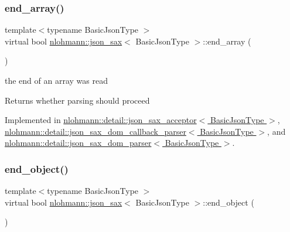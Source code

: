 \subsubsection{\texorpdfstring{end\+\_\+array()}{end\_array()}}
{\footnotesize\ttfamily template$<$typename Basic\+Json\+Type $>$ \\
virtual bool \hyperlink{structnlohmann_1_1json__sax}{nlohmann\+::json\+\_\+sax}$<$ Basic\+Json\+Type $>$\+::end\+\_\+array (\begin{DoxyParamCaption}{ }\end{DoxyParamCaption})\hspace{0.3cm}{\ttfamily [pure virtual]}}



the end of an array was read 

\begin{DoxyReturn}{Returns}
whether parsing should proceed 
\end{DoxyReturn}


Implemented in \hyperlink{classnlohmann_1_1detail_1_1json__sax__acceptor_a32579cf8b5dda19a09810f4d6f9ff9af}{nlohmann\+::detail\+::json\+\_\+sax\+\_\+acceptor$<$ Basic\+Json\+Type $>$}, \hyperlink{classnlohmann_1_1detail_1_1json__sax__dom__callback__parser_ad708f4730851caff42097dc59e610e6d}{nlohmann\+::detail\+::json\+\_\+sax\+\_\+dom\+\_\+callback\+\_\+parser$<$ Basic\+Json\+Type $>$}, and \hyperlink{classnlohmann_1_1detail_1_1json__sax__dom__parser_aa6abf5a95889056d92d6af63a831b854}{nlohmann\+::detail\+::json\+\_\+sax\+\_\+dom\+\_\+parser$<$ Basic\+Json\+Type $>$}.

\mbox{\label{structnlohmann_1_1json__sax_ad0c722d53ff97be700ccf6a9468bd456}} 
\subsubsection{\texorpdfstring{end\+\_\+object()}{end\_object()}}
{\footnotesize\ttfamily template$<$typename Basic\+Json\+Type $>$ \\
virtual bool \hyperlink{structnlohmann_1_1json__sax}{nlohmann\+::json\+\_\+sax}$<$ Basic\+Json\+Type $>$\+::end\+\_\+object (\begin{DoxyParamCaption}{ }\end{DoxyParamCaption})\hspace{0.3cm}{\ttfamily [pure virtual]}}



